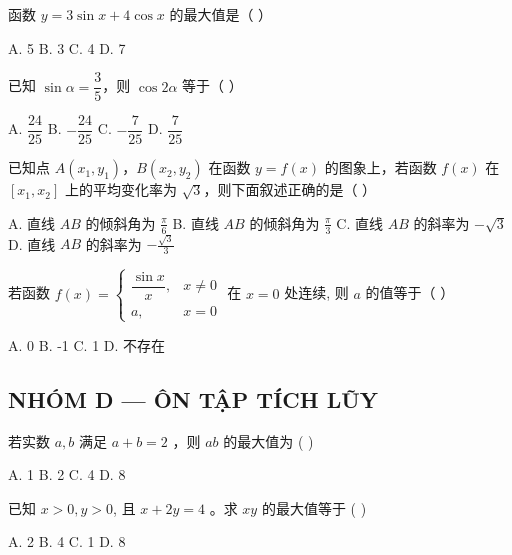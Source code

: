 \documentclass[11pt, a4paper]{article}
\begin{document}
\begin{baitap}[19]
函数 $y = 3\sin x + 4\cos x$ 的最大值是（ ）
\par\vspace{3pt}
\noindent A. 5 \quad B. 3 \quad C. 4 \quad D. 7
\end{baitap}

\begin{baitap}[20]
已知 $\sin\alpha = \dfrac{3}{5}$，则 $\cos 2\alpha$ 等于（ ）
\par\vspace{3pt}
\noindent A. $\dfrac{24}{25}$ \quad B. $-\dfrac{24}{25}$ \quad C. $-\dfrac{7}{25}$ \quad D. $\dfrac{7}{25}$
\end{baitap}

\begin{baitap}[21]
已知点 $A(x_1,y_1)$，$B(x_2,y_2)$ 在函数 $y=f(x)$ 的图象上，若函数 $f(x)$ 在 $[x_1,x_2]$ 上的平均变化率为 $\sqrt{3}$，则下面叙述正确的是（ ）
\par\vspace{3pt}
\noindent A. 直线 $AB$ 的倾斜角为 $\frac{\pi}{6}$ \quad B. 直线 $AB$ 的倾斜角为 $\frac{\pi}{3}$ \quad C. 直线 $AB$ 的斜率为 $-\sqrt{3}$ \quad D. 直线 $AB$ 的斜率为 $-\frac{\sqrt{3}}{3}$
\end{baitap}

\begin{baitap}[22]
若函数 $f(x) = \begin{cases} \dfrac{\sin x}{x}, & x \ne 0 \\ a, & x = 0 \end{cases}$ 在 $x = 0$ 处连续, 则 $a$ 的值等于（ ）
\par\vspace{3pt}
\noindent A. 0 \quad B. -1 \quad C. 1 \quad D. 不存在
\end{baitap}

\subsection*{NHÓM D — ÔN TẬP TÍCH LŨY}

\begin{baitap}[23]
若实数 $a, b$ 满足 $a + b = 2$ ，则 $ab$ 的最大值为 ( )
\par\vspace{3pt}
\noindent A. 1 \quad B. 2 \quad C. 4 \quad D. 8
\end{baitap}

\begin{baitap}[24]
已知 $x > 0, y > 0$, 且 $x + 2y = 4$ 。求 $xy$ 的最大值等于 ( )
\par\vspace{3pt}
\noindent A. 2 \quad B. 4 \quad C. 1 \quad D. 8
\end{baitap}
\end{document}
